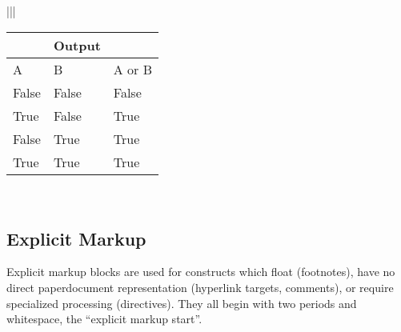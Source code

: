 \documentclass[letterpaper,10pt,english]{sphinxmanual}
\begin{document}
\begin{savenotes}
\begin{tabular}[t]{|*{2}{|}}
\begin{savenotes}\sphinxattablestart
\centering
\begin{tabulary}{\linewidth}[t]{|T|T|T|}
\hline
{}%
%
\sphinxstopmulticolumn
&\sphinxstyletheadfamily 
Output
\\
\hline\sphinxstyletheadfamily 
A
&\sphinxstyletheadfamily 
B
&\sphinxstyletheadfamily 
A or B
\\
\hline
False
&
False
&
False
\\
\hline
True
&
False
&
True
\\
\hline
False
&
True
&
True
\\
\hline
True
&
True
&
True
\\
\hline
\end{tabulary}
\par
\sphinxattableend\end{savenotes}
\\
\hline
\end{tabular}
\par
\sphinxattableend\end{savenotes}


\subsection{Explicit Markup}
\label{\detokenize{rst-cheatsheet/rst-cheatsheet:explicit-markup}}
Explicit markup blocks are used for constructs which float (footnotes), have no direct paper\sphinxhyphen{}document representation
(hyperlink targets, comments), or require specialized processing (directives).
They all begin with two periods and whitespace, the “explicit markup start”.
\end{document}
